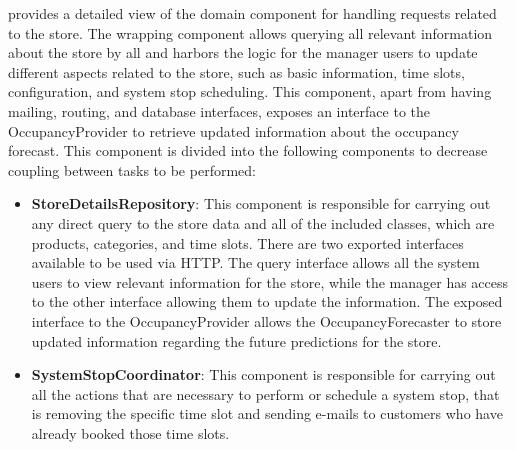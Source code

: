  provides a detailed view of the domain component for handling requests related to the store.
The wrapping component allows querying all relevant information about the store by all and harbors the logic for the manager users to update different aspects related to the store, such as basic information, time slots, configuration, and system stop scheduling.
This component, apart from having mailing, routing, and database interfaces, exposes an interface to the OccupancyProvider to retrieve updated information about the occupancy forecast. %
This component is divided into the following components to decrease coupling between tasks to be performed:
\begin{itemize}
    \item \textbf{StoreDetailsRepository}: This component is responsible for carrying out any direct query to the store data and all of the included classes, which are products, categories, and time slots.
    There are two exported interfaces available to be used via HTTP.
    The query interface allows all the system users to view relevant information for the store, while the manager has access to the other interface allowing them to update the information.
    The exposed interface to the OccupancyProvider allows the OccupancyForecaster to store updated information regarding the future predictions for the store.
    \item \textbf{SystemStopCoordinator}: This component is responsible for carrying out all the actions that are necessary to perform or schedule a system stop, that is removing the specific time slot and sending e-mails to customers who have already booked those time slots.\end{itemize}

